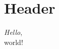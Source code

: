 \documentclass[a4paper,11pt]{article}
\begin{document}
      \section{Header}
      \textit{Hello},\\ world! %
\end{document}

